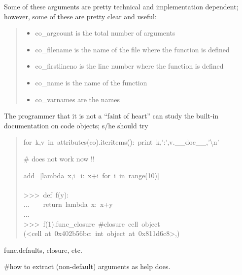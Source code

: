 \documentclass[10pt,english]{article}
\begin{document}
Some of these arguments are pretty technical and implementation dependent;
however, some of these are pretty clear and useful:
\begin{quote}
\begin{itemize}
\item {} 
co{\_}argcount is the total number of arguments

\item {} 
co{\_}filename is the name of the file where the function is defined

\item {} 
co{\_}firstlineno is the line number where the function is defined

\item {} 
co{\_}name is the name of the function

\item {} 
co{\_}varnames are the names

\end{itemize}
\end{quote}

The programmer that it is not a ``faint of heart'' can study
the built-in documentation on code objects; s/he should try
\begin{quote}
\begin{ttfamily}\begin{flushleft}
\mbox{for~k,v~in~attributes(co).iteritems():~print~k,':',v.{\_}{\_}doc{\_}{\_},'{\textbackslash}n'}
\end{flushleft}\end{ttfamily}

{\#} does not work now !!
\begin{ttfamily}\begin{flushleft}
\mbox{add=[lambda~x,i=i:~x+i~for~i~in~range(10)]}\\
\mbox{}\\
\mbox{>>>~def~f(y):}\\
\mbox{...~~~~return~lambda~x:~x+y}\\
\mbox{...}\\
\mbox{>>>~f(1).func{\_}closure~{\#}closure~cell~object}\\
\mbox{(<cell~at~0x402b56bc:~int~object~at~0x811d6c8>,)}
\end{flushleft}\end{ttfamily}
\end{quote}

func.defaults, closure, etc.

{\#}how to extract (non-default) arguments as help does.
\end{document}
